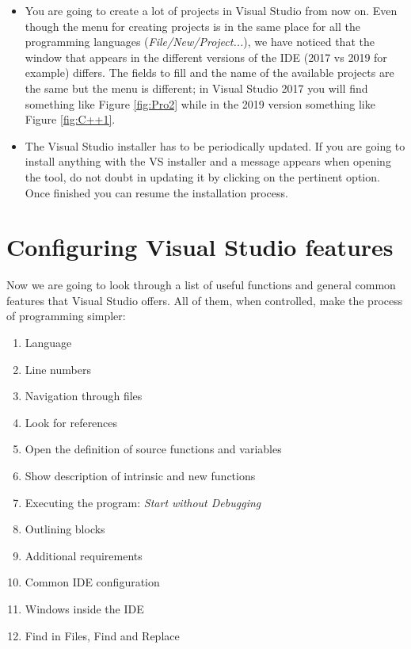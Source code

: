 \begin{IN}
    \begin{itemize}
        \item You are going to create a lot of projects in Visual Studio from now on. Even though the menu for creating projects is in the same place for all the programming languages (\textit{File/New/Project...}), we have noticed that the window that appears in the different versions of the IDE (2017 vs 2019 for example) differs. The fields to fill and the name of the available projects are the same but the menu is different; in Visual Studio 2017 you will find something like Figure \ref{fig:Pro2} while in the 2019 version something like Figure \ref{fig:C++1}.
        
        \item The Visual Studio installer has to be periodically updated. If you are going to install anything with the VS installer and a message appears when opening the tool, do not doubt in updating it by clicking on the pertinent option. Once finished you can resume the installation process. 
    \end{itemize}
\end{IN}


    \FloatBarrier
    \section{Configuring Visual Studio features} \label{sec:ConfigVS}

Now we are going to look through a list of useful functions and general common features that Visual Studio offers. All of them, when controlled, make the process of programming simpler:

\begin{enumerate}[nosep]
    \item Language
    \item Line numbers
    \item Navigation through files
    \item Look for references
    \item Open the definition of source functions and variables
    \item Show description of intrinsic and new functions
    \item Executing the program: \textit{Start without Debugging}
    \item Outlining blocks
    \item Additional requirements
    \item Common IDE configuration
    \item Windows inside the IDE
    \item Find in Files, Find and Replace
\end{enumerate}


